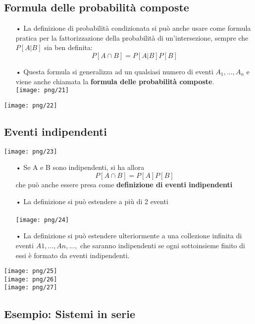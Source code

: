 \documentclass[12pt, letterpaper]{article}
\begin{document}
\subsection{Formula delle probabilità composte}

\begin{itemize}
   \item[•] La definizione di probabilità condizionata si può anche usare come formula 
      pratica per la fattorizzazione della probabilità di un'intersezione, sempre che $P[A|B]$ sia ben definita:
      \[P[A\cap B] = P[A|B]P[B]\]
   \item[•] Questa formula si generalizza ad un qualsiasi numero di eventi $A_1, ... , A_n$ e viene anche chiamata la 
      \textbf{formula delle probabilità composte}.
      \\
      \texttt{[image: png/21]}
\end{itemize}

\texttt{[image: png/22]}

\subsection{Eventi indipendenti}

\texttt{[image: png/23]}
\begin{itemize}
   \item[•] Se A e B sono indipendenti, si ha allora 
      \[P[A \cap B] = P[A]P[B]\]
      che può anche essere presa come \textbf{definizione di eventi indipendenti}
   \item[•] La definizione si può estendere a più di 2 eventi\\\\
      \texttt{[image: png/24]}
   \item[•] La definizione si può estendere ulteriormente a una collezione infinita
di eventi $A1, . . . , An, . . .,$ che saranno indipendenti se ogni
sottoinsieme finito di essi è formato da eventi indipendenti.
\end{itemize}
\texttt{[image: png/25]}\\
\texttt{[image: png/26]}\\
\texttt{[image: png/27]}

\subsection{Esempio: Sistemi in serie}
\end{document}
